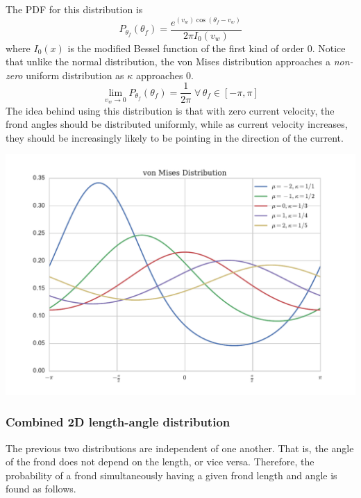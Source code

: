 \documentclass[10pt]{article}
\newenvironment{mcfig}
	{\par\medskip\noindent\minipage{\linewidth}}
	{\endminipage\par\medskip}
\begin{document}
\begin{multicols}{2}
The PDF for this distribution is
\begin{equation}
	P_{\theta_f}(\theta_f) = \frac{e^{(v_w)\cos(\theta_f-v_w)}}{2\pi I_0(v_w)}
\end{equation}
where $I_0(x)$ is the modified Bessel function of the first kind of order 0.
Notice that unlike the normal distribution, the von Mises distribution approaches a \textit{non-zero} uniform distribution as $\kappa$ approaches 0.
\begin{equation}
	\displaystyle \lim_{v_w \to 0}P_{\theta_f}(\theta_f) = \frac{1}{2\pi} \;\forall\, \theta_f \in [-\pi,\pi]
\end{equation}
The idea behind using this distribution is that with zero current velocity, the frond angles should be distributed uniformly, while as current velocity increases, they should be increasingly likely to be pointing in the direction of the current.

\begin{mcfig}
	\centering
	\includegraphics[width=\linewidth]{vonmises_2}
	\label{fig:vonmises}
\end{mcfig}

\subsubsection{Combined 2D length-angle distribution}
\label{sec:2d_dist}
The previous two distributions are independent of one another. That is, the angle of the frond does not depend on the length, or vice versa.
Therefore, the probability of a frond simultaneously having a given frond length and angle is found as follows.


\end{multicols}
\end{document}
